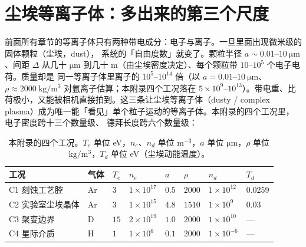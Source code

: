 
\section{尘埃等离子体：多出来的第三个尺度}
\label{sec:app-r-scale}

前面所有章节的等离子体只有两种带电成分：电子与离子。一旦里面出现微米级的固体颗粒（尘埃，dust），
系统的「自由度数」就变了。颗粒半径 $a\sim0.01$--$10\ \mathrm{\mu m}$、间距 $\Delta$ 从几十
$\mathrm{\mu m}$ 到几十 m（由尘埃密度决定）、每个颗粒带 $10$--$10^{5}$ 个电子电荷。质量却是
同一等离子体里离子的 $10^{5}$--$10^{14}$ 倍（以 $a=0.01$--$10\ \mathrm{\mu m}$、$\rho\approx2000\
\mathrm{kg/m^3}$ 对氩离子估算；本附录四个工况落在 $5\times10^{9}$--$10^{13}$）。带电重、比荷极小，又能被相机直接拍到。这三条让尘埃等离子体（dusty /
complex plasma）成为唯一能「看见」单个粒子运动的等离子体。本附录的四个工况里，电子密度跨十三个数量级、
德拜长度跨六个数量级：

\begin{table}[htbp]
  \centering
  \caption{本附录的四个工况。$T_e$ 单位 eV，$n_e$、$n_d$ 单位 $\mathrm{m^{-3}}$，$a$ 单位
    $\mathrm{\mu m}$，$\rho$ 单位 $\mathrm{kg/m^3}$，$T_d$ 单位 eV（尘埃动能温度）。}
  \label{tab:app-r-map}
  \begin{tabular}{@{}p{2.4cm}p{0.9cm}p{1.1cm}p{1.9cm}p{1.1cm}p{1.3cm}p{1.7cm}p{1.1cm}@{}}
    \toprule
    工况 & 气体 & $T_e$ & $n_e$ & $a$ & $\rho$ & $n_d$ & $T_d$ \\
    \midrule
    C1 刻蚀工艺腔 & Ar & $3$ & $1\times10^{17}$ & $0.5$ & $2000$ & $1\times10^{12}$ & $0.0259$ \\
    C2 实验室尘埃晶体 & Ar & $3$ & $1\times10^{15}$ & $4.8$ & $1510$ & $1\times10^{9}$ & $0.03$ \\
    C3 聚变边界 & D & $15$ & $2\times10^{19}$ & $1.0$ & $2000$ & $1\times10^{10}$ & --- \\
    C4 星际介质 & H & $1$ & $1\times10^{6}$ & $0.1$ & $2000$ & $1\times10^{-6}$ & --- \\
    \bottomrule
  \end{tabular}
\end{table}

